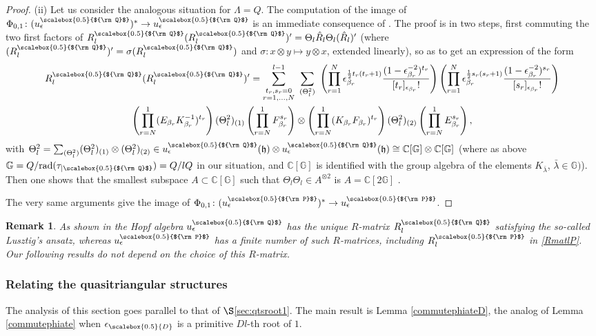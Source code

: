 \documentclass[11pt]{amsart}
\newtheorem{remark}[teo]{Remark}
\newcommand{\e}{\epsilon}
\newcommand{\mc}{\mathbb{C}}
\newcommand{\eD}{\epsilon_{\scalebox{0.5}{D}}}
\newcommand{\Q}{{\scalebox{0.5}{${\rm Q}$}}}
\newcommand{\Pup}{{\scalebox{0.5}{${\rm P}$}}}
\begin{document}
\begin{proof}
(ii) Let us consider the analogous situation for $\Lambda=Q$. The computation of the image of $\Phi_{0,1}\colon (u_\e^{\Q})^* \to u_\e^\Q$ is an immediate consequence of \cite[Prop.\,A.3.1]{Lyub95}. The proof is in two steps, first commuting the two first factors of $R_l^\Q(R_l^\Q)' = \Theta_l \hat{R}_l \Theta_l (\hat{R}_l)'$ (where $(R_l^\Q)'=\sigma(R_l^\Q)$ and $\sigma\colon x\otimes y\mapsto y\otimes x$, extended linearly), so as to get an expression of the form 
\begin{multline}\label{commutRR'}
R_l^\Q(R_l^\Q)' = \sum_{{\substack{t_r,s_r=0 \\ r=1,\ldots,N}}}^{l-1} \ \sum_{(\Theta_l^2)}\ \left(\prod_{r=1}^N \epsilon_{\beta_r}^{\frac{1}{2}t_r(t_r+1)} \frac{(1-\epsilon_{\beta_r}^{-2})^{t_r}}{[t_r]_{\epsilon_{\beta_r}} !}\right)  \left(\prod_{r=1}^N \epsilon_{\beta_r}^{\frac{1}{2}s_r(s_r+1)} \frac{(1-\epsilon_{\beta_r}^{-2})^{s_r}}{[s_r]_{\epsilon_{\beta_r}} !} \right)\\   \left(\prod_{r=N}^1 (E_{\beta_r}K_{\beta_r}^{-1})^{t_r}\right) (\Theta_l^2)_{(1)} \left(\prod_{r=N}^1  F_{\beta_r}^{s_r} \right)
\otimes  \left(\prod_{r=N}^1 (K_{\beta_r}F_{\beta_r})^{t_r}\right) (\Theta_l^2)_{(2)} \left(\prod_{r=N}^1 E_{\beta_r}^{s_r}\right),
\end{multline}
with $\Theta_l^2  = \textstyle \sum_{(\Theta_l^2)} (\Theta_l^2)_{(1)} \otimes (\Theta_l^2)_{(2)}\in u_\e^\Q(\mathfrak{h}) \otimes u_\e^\Q(\mathfrak{h}) \cong \mc[\mathbb{G}]\otimes \mc[\mathbb{G}]$ (where as above $\mathbb{G}=Q/{\rm rad}(\tau_{\vert \Q}) = Q/lQ$ in our situation, and $\mc[\mathbb{G}]$ is identified with the group algebra of the elements $K_{\bar \lambda}$, $\bar \lambda\in \mathbb{G})$). Then one shows that the smallest subspace $A \subset \mc[\mathbb{G}]$ such that $\Theta_l  \Theta_l \in A^{\otimes 2}$ is $A=\mc[2\mathbb{G}]$ . 

The very same arguments give the image of $\Phi_{0,1}\colon (u_\e^{\Pup})^* \to u_\e^\Pup$.\end{proof}

\begin{remark}\label{exRmatfev26}{\rm As shown in \cite{LN,LO} the Hopf algebra $u_\e^\Q$ has the unique $R$-matrix $R_l^\Q$ satisfying the so-called Lusztig's ansatz, whereas $u_\e^\Pup$ has a finite number of such $R$-matrices, including $R_l^\Pup$ in \eqref{RmatlP}. Our following results do not depend on the choice of this $R$-matrix. } 
\end{remark}

\subsubsection{Relating the quasitriangular structures}\label{sec:relatingfev26} The analysis of this section goes parallel to that of $\S$\ref{sec:qtsroot1}. The main result is Lemma \ref{commutephiateD}, the analog of Lemma \ref{commutephiate} when $\eD$ is a primitive $Dl$-th root of $1$. 
\end{document}
